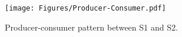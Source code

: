 \begin{figure}[t]
  \centering
  \texttt{[image: Figures/Producer-Consumer.pdf]} 
  \caption{Producer-consumer pattern between S1 and S2.}
  \label{fig:producer}
\end{figure}